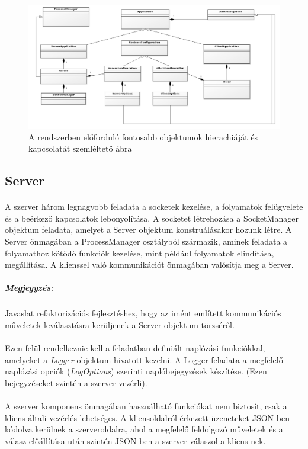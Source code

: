 \documentclass[12pt]{report}
\begin{document}
     \begin{figure}[ht]
    \includegraphics[width=16cm]{pics/classes.png}
	  \caption{A rendszerben előforduló fontosabb objektumok hierachiáját és kapcsolatát szemléltető ábra}
  \end{figure}
\subsection{Server}
  \paragraph{}
  A szerver három legnagyobb feladata a socketek kezelése, a folyamatok felügyelete és a beérkező kapcsolatok lebonyolítása. A socketet létrehozása a SocketManager objektum feladata, amelyet a Server objektum konstruálásakor hozunk létre. A Server önmagában a ProcessManager osztályból származik, aminek feladata a folyamathoz kötődő funkciók kezelése, mint például folyamatok elindítása, megállítása. A klienssel való kommunikációt önmagában valósítja meg a Server.
  
  \subparagraph{Megjegyzés:}Javaslat refaktorizációs fejlesztéshez, hogy az imént említett kommunikációs műveletek leválasztásra kerüljenek a Server objektum törzséről.
  \paragraph{}
Ezen felül rendelkeznie kell a feladatban definiált naplózási funkciókkal, amelyeket a \textit{Logger} objektum hivatott kezelni. A Logger feladata a megfelelő naplózási opciók (\textit{LogOptions}) szerinti naplóbejegyzések készítése. (Ezen bejegyzéseket szintén  a szerver vezérli).

\paragraph{}
  A szerver komponens önmagában használható funkciókat nem biztosít, csak a kliens általi vezérlés lehetséges. A kliensoldalról érkezett üzeneteket JSON-ben kódolva kerülnek a szerveroldalra, ahol a megfelelő feldolgozó műveletek és a válasz előállítása után szintén JSON-ben a szerver válaszol a kliens-nek.
  
\end{document}

